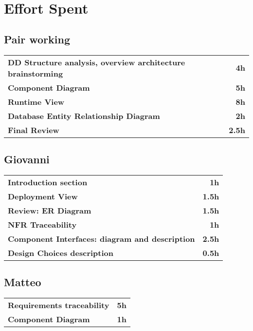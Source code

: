 \section{Effort Spent}
\subsection*{Pair working}
\begin{table}[H]
    \begin{tabular}{lr}
        \toprule
        \textbf{DD Structure analysis, overview architecture brainstorming} & \textbf{4h}   \\
        \textbf{Component Diagram}                                          & \textbf{5h}   \\
        \textbf{Runtime View}                                               & \textbf{8h}   \\
        \textbf{Database Entity Relationship Diagram}                       & \textbf{2h}   \\
        \textbf{Final Review}                                               & \textbf{2.5h} \\
        \bottomrule
    \end{tabular}
\end{table}

\subsection*{Giovanni}
\begin{table}[H]
    \begin{tabular}{lr}
        \toprule
        \textbf{Introduction section}                          & \textbf{1h}   \\
        \textbf{Deployment View}                               & \textbf{1.5h} \\
        \textbf{Review: ER Diagram}                            & \textbf{1.5h} \\
        \textbf{NFR Traceability}                              & \textbf{1h}   \\
        \textbf{Component Interfaces: diagram and description} & \textbf{2.5h}   \\
        \textbf{Design Choices description}                    & \textbf{0.5h} \\
        \bottomrule
    \end{tabular}
\end{table}

\subsection*{Matteo}
\begin{table}[H]
    \begin{tabular}{lr}
        \toprule
        \textbf{Requirements traceability} & \textbf{5h} \\
        \textbf{Component Diagram}         & \textbf{1h} \\
        \bottomrule
    \end{tabular}
\end{table}

